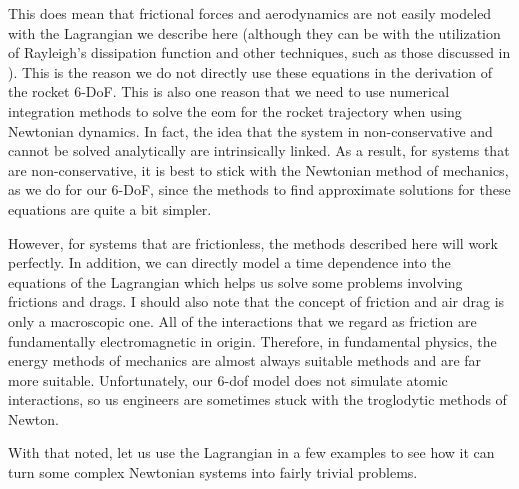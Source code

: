 This does mean that frictional forces and aerodynamics are not easily modeled with the \gls{Lagrangian} we describe here (although they can be with the utilization of Rayleigh's dissipation function and other techniques, such as those discussed in \cite{rabei_hamiltonian_2004}). This is the reason we do not directly use these equations in the derivation of the rocket 6-DoF. This is also one reason that we need to use numerical integration methods to solve the \gls{eom} for the rocket trajectory when using Newtonian dynamics. In fact, the idea that the system in non-\gls{conservative} and cannot be solved analytically are intrinsically linked. As a result, for systems that are non-conservative, it is best to stick with the Newtonian method of mechanics, as we do for our 6-DoF, since the methods to find approximate solutions for these equations are quite a bit simpler. 

However, for systems that are frictionless, the methods described here will work perfectly. In addition, we can directly model a time dependence into the equations of the \gls{Lagrangian} which helps us solve some problems involving frictions and drags. I should also note that the concept of friction and air drag is only a macroscopic one. All of the interactions that we regard as friction are fundamentally electromagnetic in origin. Therefore, in fundamental physics, the energy methods of mechanics are almost always suitable methods and are far more suitable. Unfortunately, our 6-\gls{dof} model does not simulate atomic interactions, so us engineers are sometimes stuck with the troglodytic methods of Newton.

With that noted, let us use the \gls{Lagrangian} in a few examples to see how it can turn some complex Newtonian systems into fairly trivial problems.

